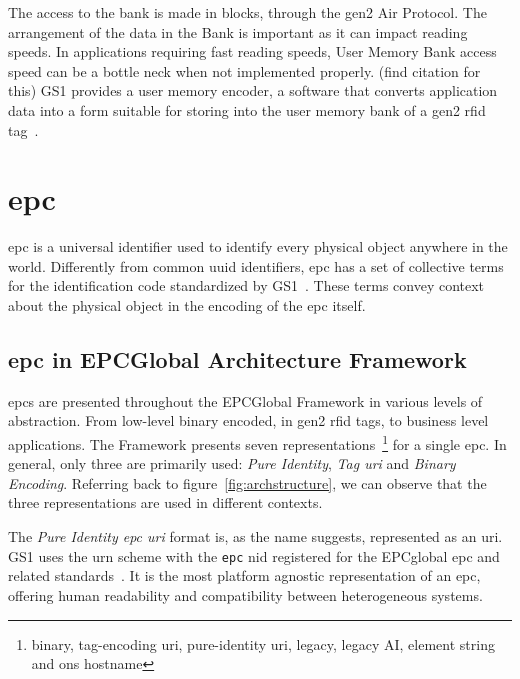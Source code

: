 The access to the bank is made in blocks, through the \ac{gen2} Air Protocol. The arrangement of the data in the Bank is important as it can impact reading speeds.
In applications requiring fast reading speeds, User Memory Bank access speed can be a bottle neck when not implemented properly. (find citation for this)
GS1 provides a user memory encoder, a software that converts application data into a form suitable for storing into the user memory bank of a \ac{gen2} \ac{rfid} tag~\cite{marco.santos.diamondFAQ2020}.

\section{\ac{epc}} \label{sec:epc}


\ac{epc} is a universal identifier used to identify every physical object anywhere in the world.
Differently from common \ac{uuid} identifiers, \ac{epc} has a set of collective terms for the identification code standardized by GS1~\cite{GS1GeneralSpecifications}. These terms convey context about the physical object in the encoding of the \ac{epc} itself.

\subsection{\ac{epc} in EPCGlobal Architecture Framework}

\acp{epc} are presented throughout the EPCGlobal Framework in various levels of abstraction. From low-level binary encoded, in \ac{gen2} \ac{rfid} tags, to business level applications.
The Framework presents seven representations~\footnote{binary, tag-encoding \ac{uri}, pure-identity \ac{uri}, legacy, legacy AI, element string and \ac{ons} hostname} for a single \ac{epc}. In general, only three are primarily used: \emph{Pure Identity}, \emph{Tag \ac{uri}} and \emph{Binary Encoding}.
Referring back to figure~\ref{fig:archstructure}, we can observe that the three representations are used in different contexts.

The \emph{Pure Identity \ac{epc} \ac{uri}} format is, as the name suggests, represented as an \ac{uri}.
GS1 uses the \ac{urn} scheme with the \texttt{epc} \ac{nid} registered for the EPCglobal \ac{epc} and related standards~\cite{meallingUniformResourceName}.
It is the most platform agnostic representation of an \ac{epc}, offering human readability and compatibility between heterogeneous systems. 

